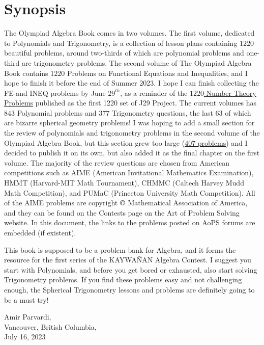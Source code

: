 \documentclass[12pt,a4paper]{memoir}
\theoremstyle{definition}
\begin{document}
\section*{Synopsis}
The Olympiad Algebra Book comes in two volumes. The first volume, dedicated to Polynomials and Trigonometry, is a collection of lesson plans containing $1220$ beautiful problems, around two-thirds of which are polynomial problems and one-third are trigonometry problems. The second volume of The Olympiad Algebra Book contains $1220$ Problems on Functional Equations and Inequalities, and I hope to finish it before the end of Summer 2023. I hope I can finish collecting the FE and INEQ problems by June $29^{th}$, as a reminder of the \href{https://www.academia.edu/29934442/1220_Number_Theory_Problems_J29_Project}{$1220$ Number Theory Problems} published as the first 1220 set of J29 Project. The current volumes has $843$ Polynomial problems and $377$ Trigonometry questions, the last $63$ of which are bizarre spherical geometry problems! I was hoping to add a small section for the review of polynomials and trigonometry problems in the second volume of the Olympiad Algebra Book, but this section grew too large (\href{https://www.academia.edu/104610994/407_Polynomials_and_Trigonometry_Review_Problems}{407 problems}) and I decided to publish it on its own, but also added it as the final chapter on the first volume. The majority of the review questions are chosen from American competitions such as AIME (American Invitational Mathematics Examination), HMMT (Harvard-MIT Math Tournament), CHMMC (Caltech Harvey Mudd Math Competition), and PUMaC (Princeton University Math Competition). All of the AIME problems are copyright $\copyright$ Mathematical Association of America, and they can be found on the Contests page on the Art of Problem Solving website. In this document, the links to the problems posted on AoPS forums are embedded (if existent). 

\vspace{0.5em}

This book is supposed to be a problem bank for Algebra, and it forms the resource for the first series of the KAYWAÑAN Algebra Contest. I suggest you start with Polynomials, and before you get bored or exhausted, also start solving Trigonometry problems. If you find these problems easy and not challenging enough, the Spherical Trigonometry lessons and problems are definitely going to be a must try!

\begin{flushright}
	Amir Parvardi,\\
	Vancouver, British Columbia,\\
	July 16, 2023
\end{flushright}
\end{document}
